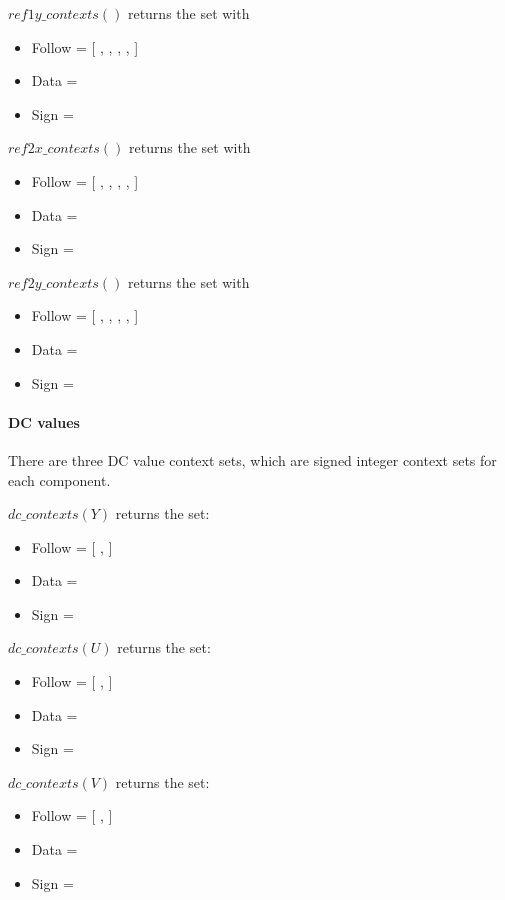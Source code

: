 $ref1y\_contexts()$ returns the set with
\begin{itemize}
\item Follow = [ \RefOneyFollowOne, \RefOneyFollowTwo, \RefOneyFollowThree, \RefOneyFollowFour, \RefOneyFollowFivePlus ]
\item Data = \RefOneyData
\item Sign = \RefOneySign
\end{itemize}

$ref2x\_contexts()$ returns the set with
\begin{itemize}
\item Follow = [ \RefTwoxFollowOne, \RefTwoxFollowTwo, \RefTwoxFollowThree, \RefTwoxFollowFour, \RefTwoxFollowFivePlus ]
\item Data = \RefTwoxData
\item Sign = \RefTwoxSign
\end{itemize}

$ref2y\_contexts()$ returns the set with
\begin{itemize}
\item Follow = [ \RefTwoyFollowOne, \RefTwoyFollowTwo, \RefTwoyFollowThree, \RefTwoyFollowFour, \RefTwoyFollowFivePlus ]
\item Data = \RefTwoyData
\item Sign = \RefTwoySign
\end{itemize}

\paragraph{DC values \\}
\label{dcvaluecontexts}

There are three DC value context sets, which are signed integer context sets for each component. 

$dc\_contexts(Y)$ returns the set:

\begin{itemize}
\item Follow = [ \YDCFollowOne, \YDCFollowTwoPlus ]
\item Data = \YDCData
\item Sign = \YDCSign
\end{itemize}

$dc\_contexts(U)$ returns the set:

\begin{itemize}
\item Follow = [ \UDCFollowOne, \UDCFollowTwoPlus ]
\item Data = \UDCData
\item Sign = \UDCSign
\end{itemize}

$dc\_contexts(V)$ returns the set:

\begin{itemize}
\item Follow = [ \VDCFollowOne, \VDCFollowTwoPlus ]
\item Data = \VDCData
\item Sign = \VDCSign
\end{itemize}